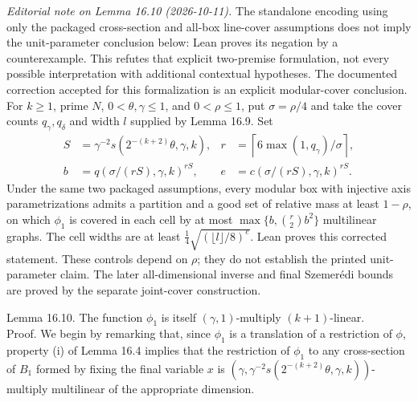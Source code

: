 \documentclass[10pt]{article}
\begin{document}
\emph{Editorial note on Lemma 16.10 (2026-10-11).}
The standalone encoding using only the packaged cross-section and all-box
line-cover assumptions does not imply the unit-parameter conclusion below:
Lean proves its negation by a counterexample. This refutes that explicit
two-premise formulation, not every possible interpretation with additional
contextual hypotheses. The documented correction accepted for this
formalization is an explicit modular-cover conclusion. For $k\geqslant1$,
prime $N$, $0<\theta,\gamma\leqslant1$, and $0<\rho\leqslant1$, put
$\sigma=\rho/4$ and take the cover counts $q_\gamma,q_\delta$ and width
$l$ supplied by Lemma 16.9. Set
\[
\begin{aligned}
 S&=\gamma^{-2}s(2^{-(k+2)}\theta,\gamma,k), &
 r&=\left\lceil 6\max(1,q_\gamma)/\sigma\right\rceil,\\
 b&=q(\sigma/(rS),\gamma,k)^{rS}, &
 e&=c(\sigma/(rS),\gamma,k)^{rS}.
\end{aligned}
\]
Under the same two packaged assumptions, every modular box with injective
axis parametrizations admits a partition and a good set of relative mass
at least $1-\rho$, on which $\phi_1$ is covered in each cell by at most
$\max\{b,\binom r2 b^2\}$ multilinear graphs. The cell widths are at least
$\frac14\sqrt{(\lfloor l\rfloor/8)^e}$. Lean proves this corrected statement.
These controls depend on $\rho$; they do not establish the printed
unit-parameter claim. The later all-dimensional inverse and final
Szemer\'edi bounds are proved by the separate joint-cover construction.

Lemma 16.10. The function $\phi_{1}$ is itself $(\gamma, 1)$-multiply $(k+1)$-linear.\\
Proof. We begin by remarking that, since $\phi_{1}$ is a translation of a restriction of $\phi$, property (i) of Lemma 16.4 implies that the restriction of $\phi_{1}$ to any cross-section of $B_{1}$ formed by fixing the final variable $x$ is $\left(\gamma, \gamma^{-2} s\left(2^{-(k+2)} \theta, \gamma, k\right)\right)$-multiply multilinear of the appropriate dimension.
\end{document}
